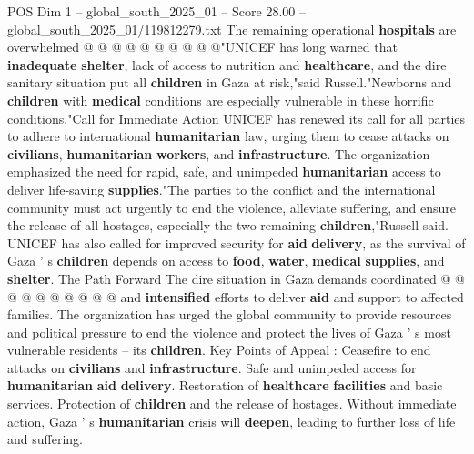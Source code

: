 \begin{textsample}{POS Dim 1 – global\_south\_2025\_01 – Score 28.00 – global\_south\_2025\_01/119812279.txt}
The remaining operational \textbf{hospitals} are overwhelmed @ @ @ @ @ @ @ @ @ @"UNICEF has long warned that \textbf{inadequate} \textbf{shelter}, lack of access to nutrition and \textbf{healthcare}, and the dire sanitary situation put all \textbf{children} in Gaza at risk,"said Russell."Newborns and \textbf{children} with \textbf{medical} conditions are especially vulnerable in these horrific conditions."Call for Immediate Action UNICEF has renewed its call for all parties to adhere to international \textbf{humanitarian} law, urging them to cease attacks on \textbf{civilians}, \textbf{humanitarian} \textbf{workers}, and \textbf{infrastructure}.
The organization emphasized the need for rapid, safe, and unimpeded \textbf{humanitarian} access to deliver life-saving \textbf{supplies}."The parties to the conflict and the international community must act urgently to end the violence, alleviate suffering, and ensure the release of all hostages, especially the two remaining \textbf{children},"Russell said.
UNICEF has also called for improved security for \textbf{aid} \textbf{delivery}, as the survival of Gaza ' s \textbf{children} depends on access to \textbf{food}, \textbf{water}, \textbf{medical} \textbf{supplies}, and \textbf{shelter}.
The Path Forward The dire situation in Gaza demands coordinated @ @ @ @ @ @ @ @ @ @ and \textbf{intensified} efforts to deliver \textbf{aid} and support to affected families.
The organization has urged the global community to provide resources and political pressure to end the violence and protect the lives of Gaza ' s most vulnerable residents -- its \textbf{children}.
Key Points of Appeal : Ceasefire to end attacks on \textbf{civilians} and \textbf{infrastructure}.
Safe and unimpeded access for \textbf{humanitarian} \textbf{aid} \textbf{delivery}.
Restoration of \textbf{healthcare} \textbf{facilities} and basic services.
Protection of \textbf{children} and the release of hostages.
Without immediate action, Gaza ' s \textbf{humanitarian} crisis will \textbf{deepen}, leading to further loss of life and suffering.

\end{textsample}
